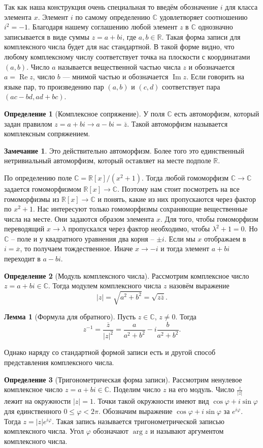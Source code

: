 \documentclass[10pt,a4paper,oneside]{book}
\theoremstyle{definition}
\newtheorem*{rem}{Замечание}
\newtheorem*{defn}{Определение}
\newtheorem{lem}{Лемма}
\newcommand{\mb}[1]{\mathbb{#1}}
\newcommand{\ovl}{\overline}
\newcommand{\im}{\operatorname{Im}}
\newcommand{\re}{\operatorname{Re}}
\def\dfn{\begin{defn}}
\def\edfn{\end{defn}}
\def\lm{\begin{lem}}
\def\elm{\end{lem}}
\def\rm{\begin{rem}}
\def\erm{\end{rem}}
\begin{document}
Так как наша конструкция очень специальная то введём обозначение $i$ для класса элемента $x$. Элемент $i$ по самому определению $\mb C$ удовлетворяет соотношению $i^2=-1$. Благодаря нашему соглашению любой элемент $z$ в $\mb C$ однозначно записывается в виде суммы $z=a+bi$, где $a,b\in \mb R$. Такая форма записи для комплексного числа будет для нас стандартной. В такой форме видно, что любому комплексному числу соответствует точка на плоскости с координатами $(a,b)$. Число $a$ называется вещественной частью числа $z$ и обозначается $a=\re z$, число $b$ --- мнимой частью и обозначается $\im z$. Если говорить на языке пар, то произведению пар $(a,b)$ и $(c,d)$ соответствует пара $(ac-bd,ad+bc)$.

\dfn[Комплексное сопряжение] У поля $\mb C$ есть автоморфизм, который задан правилом $z=a+bi \to a-bi=\ovl{z}$. Такой автоморфизм называется комплексным сопряжением.
\edfn

\rm Это действительно автоморфизм. Более того это единственный нетривиальный автоморфизм, который оставляет на месте подполе $\mb R$.

\proof По определению поле $\mb C = \mb R[x]/(x^2+1)$. Тогда любой гомоморфизм $\mb C \to \mb C$ задается гомоморфизмом $\mb R[x]\to \mb C$. Поэтому нам стоит посмотреть на все гомоморфизмы из $\mb R[x]\to \mb C$ и понять, какие из них пропускаются через фактор по $x^2+1$. Нас интересуют только гомоморфизмы сохраняющие вещественные числа на месте. Они задаются образом элемента $x$. Для того, чтобы гомоморфизм переводящий $x \to \lambda$ пропускался через фактор необходимо, чтобы $\lambda^2+1=0$. Но $\mb C$ -- поле и у квадратного уравнения два корня -- $\pm i$. Если мы $x$ отображаем в $i=\ovl{x}$, то получаем тождественное. Иначе $x\to -i$ и тогда элемент $a+bi$ переходит в $a-bi$.
\endproof
\erm

\dfn[Модуль комплексного числа] Рассмотрим комплексное число $z=a+bi\in \mb C$. Тогда модулем комплексного числа $z$ назовём выражение
$$|z|=\sqrt{a^2+b^2}=\sqrt{z\ovl{z}}.$$
\edfn

\lm[Формула для обратного] Пусть $z\in \mb C$, $z\neq 0$. Тогда
$$ z^{-1} =\frac{\ovl{z}}{|z|^2}= \frac{a}{a^2+b^2}-i\frac{b}{a^2+b^2}.$$
\elm

Однако наряду со стандартной формой записи есть и другой способ представления комплексного числа.

\dfn[Тригонометрическая форма записи] Рассмотрим ненулевое комплексное число $z= a+bi\in\mb C$. Поделим число $z$ на его модуль. Число
$\frac{z}{|z|}$ лежит на окружности $|z| = 1$. Точки такой окружности имеют вид $\cos\varphi +i\sin\varphi$ для единственного $0 \leq \varphi < 2\pi$. Обозначим выражение $\cos\varphi+i\sin\varphi$ за $e^{i\varphi}$. Тогда $z=|z|e^{i\varphi}$.
Такая запись называется тригонометрической записью комплексного числа. Угол $\varphi$ обозначают $\arg z$ и называют
аргументом комплексного числа.
\edfn
\end{document}

